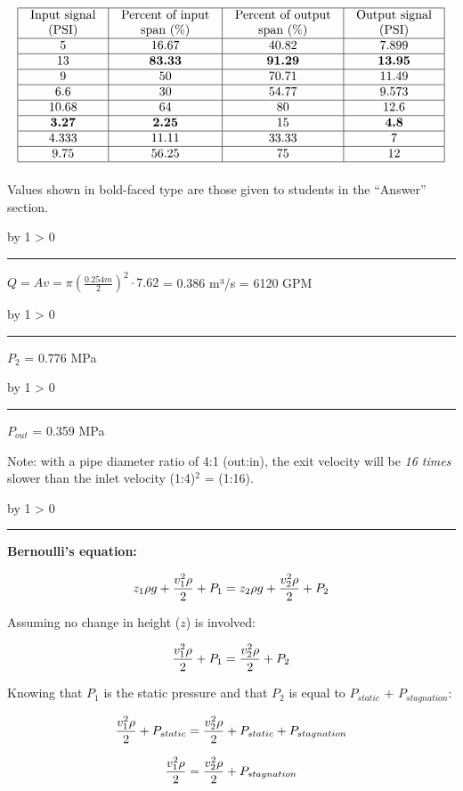 \documentclass[12pt,a4paper]{article}
\def\svar{
           \advance\answnum by 1
           \ifnum \answnum > 0
                \hrule
                \vskip 3pt
                \leftline{Svar \the\answnum}
                \vskip 3pt \fi}
\begin{document}
$$\vbox{\offinterlineskip
\halign{\strut
\vrule \quad\hfil # \ \hfil & 
\vrule \quad\hfil # \ \hfil & 
\vrule \quad\hfil # \ \hfil & 
\vrule \quad\hfil # \ \hfil \vrule \cr
\noalign{\hrule}
%
Input signal & Percent of input & Percent of output & Output signal \cr
%
(PSI) & span (\%) & span (\%) & (PSI) \cr
%
\noalign{\hrule}
%
5 & 16.67 & 40.82 & 7.899 \cr
%
\noalign{\hrule}
%
13 & {\bf 83.33} & {\bf 91.29} & {\bf 13.95} \cr
%
\noalign{\hrule}
%
9 & 50 & 70.71 & 11.49 \cr
%
\noalign{\hrule}
%
6.6 & 30 & 54.77 & 9.573 \cr
%
\noalign{\hrule}
%
10.68 & 64 & 80 & 12.6 \cr
%
\noalign{\hrule}
%
{\bf 3.27} & {\bf 2.25} & 15 & {\bf 4.8} \cr
%
\noalign{\hrule}
%
4.333 & 11.11 & 33.33 & 7 \cr
%
\noalign{\hrule}
%
9.75 & 56.25 & 75 & 12 \cr
%
\noalign{\hrule}
} %
}$$ %

Values shown in bold-faced type are those given to students in the ``Answer'' section.
\noindent


\vskip 10pt \filbreak 
\svar{} 

$Q=Av=\pi(\frac{0.254m}{2})^2\cdot 7.62$ = 0.386 m³/s = 6120 GPM

\vskip 10pt \filbreak 
\svar{} 

$P_2$ = 0.776 MPa

\vskip 10pt \filbreak 
\svar{} 

$P_{out}$ = 0.359 MPa

\vskip 10pt

Note: with a pipe diameter ratio of 4:1 (out:in), the exit velocity will be {\it 16 times} slower than the inlet velocity (1:4)$^{2}$ = (1:16).

\vskip 10pt \filbreak 
\svar{} 

\noindent
{\bf Bernoulli's equation:}

$$z_1 \rho g + {v_1^2 \rho \over 2} + P_1 = z_2 \rho g + {v_2^2 \rho \over 2} + P_2$$

Assuming no change in height ($z$) is involved:

$${v_1^2 \rho \over 2} + P_1 = {v_2^2 \rho \over 2} + P_2$$

Knowing that $P_1$ is the static pressure and that $P_2$ is equal to $P_{static}$ + $P_{stagnation}$:

$${v_1^2 \rho \over 2} + P_{static} = {v_2^2 \rho \over 2} + P_{static} + P_{stagnation}$$

$${v_1^2 \rho \over 2} = {v_2^2 \rho \over 2} + P_{stagnation}$$
\end{document}
